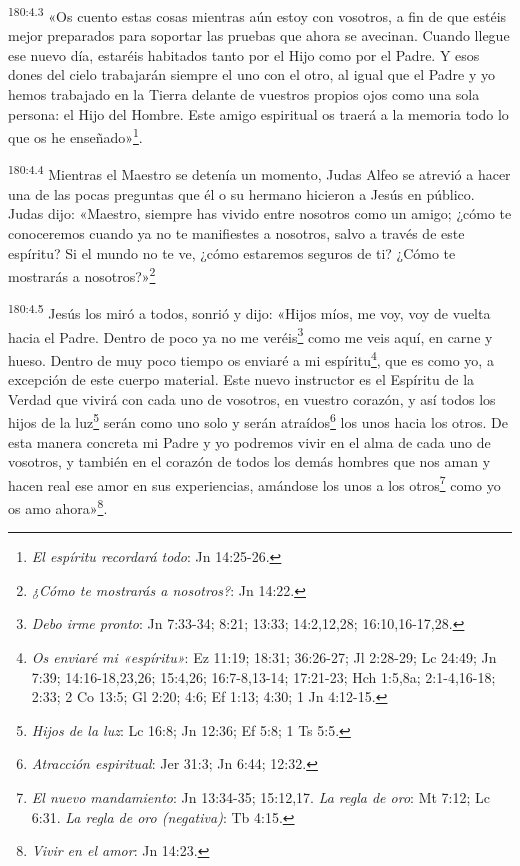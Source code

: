\par 
\textsuperscript{180:4.3} «Os cuento estas cosas mientras aún estoy con vosotros, a fin de que estéis mejor preparados para soportar las pruebas que ahora se avecinan. Cuando llegue ese nuevo día, estaréis habitados tanto por el Hijo como por el Padre. Y esos dones del cielo trabajarán siempre el uno con el otro, al igual que el Padre y yo hemos trabajado en la Tierra delante de vuestros propios ojos como una sola persona: el Hijo del Hombre. Este amigo espiritual os traerá a la memoria todo lo que os he enseñado»\footnote{\textit{El espíritu recordará todo}: Jn 14:25-26.}.

\par 
\textsuperscript{180:4.4} Mientras el Maestro se detenía un momento, Judas Alfeo se atrevió a hacer una de las pocas preguntas que él o su hermano hicieron a Jesús en público. Judas dijo: «Maestro, siempre has vivido entre nosotros como un amigo; ¿cómo te conoceremos cuando ya no te manifiestes a nosotros, salvo a través de este espíritu? Si el mundo no te ve, ¿cómo estaremos seguros de ti? ¿Cómo te mostrarás a nosotros?»\footnote{\textit{¿Cómo te mostrarás a nosotros?}: Jn 14:22.}

\par 
\textsuperscript{180:4.5} Jesús los miró a todos, sonrió y dijo: «Hijos míos, me voy, voy de vuelta hacia el Padre. Dentro de poco ya no me veréis\footnote{\textit{Debo irme pronto}: Jn 7:33-34; 8:21; 13:33; 14:2,12,28; 16:10,16-17,28.} como me veis aquí, en carne y hueso. Dentro de muy poco tiempo os enviaré a mi espíritu\footnote{\textit{Os enviaré mi «espíritu»}: Ez 11:19; 18:31; 36:26-27; Jl 2:28-29; Lc 24:49; Jn 7:39; 14:16-18,23,26; 15:4,26; 16:7-8,13-14; 17:21-23; Hch 1:5,8a; 2:1-4,16-18; 2:33; 2 Co 13:5; Gl 2:20; 4:6; Ef 1:13; 4:30; 1 Jn 4:12-15.}, que es como yo, a excepción de este cuerpo material. Este nuevo instructor es el Espíritu de la Verdad que vivirá con cada uno de vosotros, en vuestro corazón, y así todos los hijos de la luz\footnote{\textit{Hijos de la luz}: Lc 16:8; Jn 12:36; Ef 5:8; 1 Ts 5:5.} serán como uno solo y serán atraídos\footnote{\textit{Atracción espiritual}: Jer 31:3; Jn 6:44; 12:32.} los unos hacia los otros. De esta manera concreta mi Padre y yo podremos vivir en el alma de cada uno de vosotros, y también en el corazón de todos los demás hombres que nos aman y hacen real ese amor en sus experiencias, amándose los unos a los otros\footnote{\textit{El nuevo mandamiento}: Jn 13:34-35; 15:12,17. \textit{La regla de oro}: Mt 7:12; Lc 6:31. \textit{La regla de oro (negativa)}: Tb 4:15.} como yo os amo ahora»\footnote{\textit{Vivir en el amor}: Jn 14:23.}.

